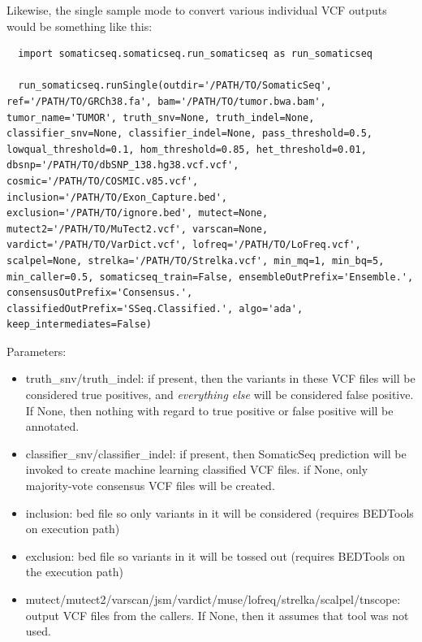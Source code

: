 \documentclass[10pt,letterpaper]{article}
\begin{document}
\begin{sloppypar}
Likewise, the single sample mode to convert various individual VCF outputs would be something like this:

\begin{lstlisting}
  import somaticseq.somaticseq.run_somaticseq as run_somaticseq
  
  run_somaticseq.runSingle(outdir='/PATH/TO/SomaticSeq', ref='/PATH/TO/GRCh38.fa', bam='/PATH/TO/tumor.bwa.bam', tumor_name='TUMOR', truth_snv=None, truth_indel=None, classifier_snv=None, classifier_indel=None, pass_threshold=0.5, lowqual_threshold=0.1, hom_threshold=0.85, het_threshold=0.01, dbsnp='/PATH/TO/dbSNP_138.hg38.vcf.vcf', cosmic='/PATH/TO/COSMIC.v85.vcf', inclusion='/PATH/TO/Exon_Capture.bed', exclusion='/PATH/TO/ignore.bed', mutect=None, mutect2='/PATH/TO/MuTect2.vcf', varscan=None, vardict='/PATH/TO/VarDict.vcf', lofreq='/PATH/TO/LoFreq.vcf', scalpel=None, strelka='/PATH/TO/Strelka.vcf', min_mq=1, min_bq=5, min_caller=0.5, somaticseq_train=False, ensembleOutPrefix='Ensemble.', consensusOutPrefix='Consensus.', classifiedOutPrefix='SSeq.Classified.', algo='ada', keep_intermediates=False)
\end{lstlisting}


Parameters:

\begin{itemize}

\item truth\_snv/truth\_indel: if present, then the variants in these VCF files will be considered true positives, and \emph{everything else} will be considered false positive. If None, then nothing with regard to true positive or false positive will be annotated. 

\item classifier\_snv/classifier\_indel: if present, then SomaticSeq prediction will be invoked to create machine learning classified VCF files. if None, only majority-vote consensus VCF files will be created. 

\item inclusion: bed file so only variants in it will be considered (requires BEDTools on execution path)

\item exclusion: bed file so variants in it will be tossed out (requires BEDTools on the execution path)

\item mutect/mutect2/varscan/jsm/vardict/muse/lofreq/strelka/scalpel/tnscope: output VCF files from the callers. If None, then it assumes that tool was not used. 


\end{itemize}
\end{sloppypar}
\end{document}

